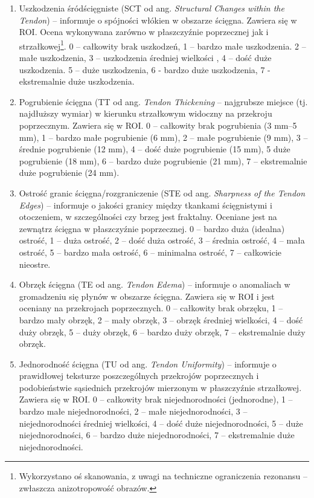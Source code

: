 \begin{enumerate}
	\item Uszkodzenia śródścięgniste (SCT od ang. \textit{Structural Changes within the Tendon}) -- informuje o spójności włókien w obszarze ścięgna. Zawiera się w ROI. Ocena wykonywana zarówno w płaszczyźnie poprzecznej jak i strzałkowej\footnote{Wykorzystano oś skanowania, z uwagi na techniczne ograniczenia rezonansu -- zwłaszcza anizotropowość obrazów.}. 0 – całkowity brak uszkodzeń, 1 – bardzo małe uszkodzenia. 2 – małe uszkodzenia, 3 – uszkodzenia średniej wielkości , 4 – dość duże uszkodzenia. 5 – duże uszkodzenia, 6 - bardzo duże uszkodzenia, 7 - ekstremalnie duże uszkodzenia.
	\item Pogrubienie ścięgna (TT od ang. \textit{Tendon Thickening} -- najgrubsze miejsce (tj. najdłuższy wymiar) w kierunku strzałkowym widoczny na przekroju poprzecznym. Zawiera się w ROI. 0 – całkowity brak pogrubienia (3 mm--5 mm), 1 – bardzo małe pogrubienie (6 mm), 2 – małe pogrubienie (9 mm), 3 – średnie pogrubienie (12 mm), 4 –  dość duże pogrubienie (15 mm), 5 duże pogrubienie (18 mm), 6 – bardzo duże pogrubienie (21 mm), 7 – ekstremalnie duże pogrubienie (24 mm).
	\item Ostrość granic ścięgna/rozgraniczenie (STE od ang. \textit{Sharpness of the Tendon Edges}) -- informuje o jakości granicy między tkankami ścięgnistymi i otoczeniem, w szczególności czy brzeg jest fraktalny. Oceniane jest na zewnątrz ścięgna w płaszczyźnie poprzecznej. 0 – bardzo duża (idealna) ostrość, 1 – duża ostrość, 2 – dość duża ostrość, 3 – średnia ostrość, 4 – mała ostrość, 5 – bardzo mała ostrość, 6 – minimalna ostrość, 7 – całkowicie nieostre.
	\item Obrzęk ścięgna (TE od ang. \textit{Tendon Edema}) -- informuje o anomaliach \linebreak w gromadzeniu się płynów w obszarze ścięgna. Zawiera się w ROI i jest oceniany na przekrojach poprzecznych. 0 – całkowity brak obrzęku, 1 – bardzo mały obrzęk, 2 – mały obrzęk, 3 – obrzęk średniej wielkości, 4 – dość duży obrzęk, 5 – duży obrzęk, 6 – bardzo duży obrzęk, 7 -- ekstremalnie duży obrzęk.
	\item Jednorodność ścięgna (TU od ang. \textit{Tendon Uniformity}) -- informuje o prawidłowej teksturze poszczególnych przekrojów poprzecznych i podobieństwie sąsiednich przekrojów mierzonym w płaszczyźnie strzałkowej. Zawiera się w ROI. 0 – całkowity brak niejednorodności (jednorodne), 1 – bardzo małe niejednorodności, 2 – małe niejednorodności, 3 – niejednorodności średniej wielkości, 4 – dość duże niejednorodności, 5 – duże niejednorodności, 6 – bardzo duże niejednorodności, 7 –  ekstremalnie duże niejednorodności. 

\end{enumerate}
